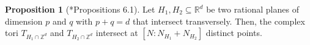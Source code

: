 \documentclass[11pt]{amsart}
\def\Log{{\rm Log}}
\theoremstyle{definition}
\newtheorem{proposition}[theorem]{Proposition}
\newcommand{\R}{\mathbb{R}}
\newcommand{\Z}{\mathbb{Z}}
\newcommand{\cC}{\mathcal{C}}
\newcommand{\sT}{\mathscr{T}}
\newcommand{\supp}[1]{{\mathrm{supp}(#1)}}
\begin{document}

\begin{proposition}[\cite{Katz-toolkit}*{Propositions 6.1}]\label{prop:int-numb-tori}
    Let $H_1, H_2\subseteq \R^d$ be two rational planes of dimension $p$ and $q$ with $p+q=d$ that intersect transversely. Then, the complex tori
    $T_{H_1 \cap \Z^d}$ and $T_{H_2 \cap \Z^d}$ intersect at $[N: N_{H_1} + N_{H_2}]$ distinct points. 
\end{proposition}
\end{document}
